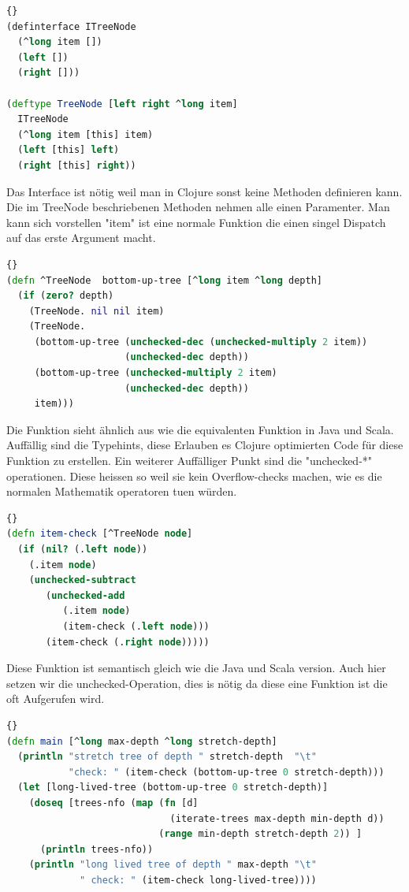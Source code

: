 \documentclass{fancydocument}
\begin{document}
\begin{lstlisting}[language=Clojure,caption=Node and Interface]{}
(definterface ITreeNode
  (^long item [])
  (left [])
  (right []))

(deftype TreeNode [left right ^long item]
  ITreeNode
  (^long item [this] item)
  (left [this] left)
  (right [this] right))
\end{lstlisting}

Das Interface ist n\"otig weil man in Clojure sonst keine Methoden
definieren kann. Die im TreeNode beschriebenen Methoden nehmen alle
einen Paramenter. Man kann sich vorstellen "item" ist eine normale
Funktion die einen singel Dispatch auf das erste Argument macht.
\\
\begin{lstlisting}[language=Clojure,caption=Cljure Tree Function]{}
(defn ^TreeNode  bottom-up-tree [^long item ^long depth]
  (if (zero? depth)
    (TreeNode. nil nil item)
    (TreeNode.
     (bottom-up-tree (unchecked-dec (unchecked-multiply 2 item))
                     (unchecked-dec depth))
     (bottom-up-tree (unchecked-multiply 2 item)
                     (unchecked-dec depth))
     item)))
\end{lstlisting}

Die Funktion sieht \"ahnlich aus wie die equivalenten Funktion in Java
und Scala. Auff\"allig sind die Typehints, diese Erlauben es Clojure
optimierten Code f\"ur diese Funktion zu erstellen. Ein weiterer
Auff\"alliger Punkt sind die "unchecked-*" operationen. Diese heissen
so weil sie kein Overflow-checks machen, wie es die normalen
Mathematik operatoren tuen w\"urden.
\\
\begin{lstlisting}[language=Clojure,caption=Cljure item-check]{}
(defn item-check [^TreeNode node]
  (if (nil? (.left node))
    (.item node)
    (unchecked-subtract
       (unchecked-add 
          (.item node)
          (item-check (.left node)))
       (item-check (.right node)))))
\end{lstlisting}

Diese Funktion ist semantisch gleich wie die Java und Scala
version. Auch hier setzen wir die unchecked-Operation, dies is n\"otig
da diese eine Funktion ist die oft Aufgerufen wird.
\\
\begin{lstlisting}[language=Clojure,caption=Clojure Main]{}
(defn main [^long max-depth ^long stretch-depth]
  (println "stretch tree of depth " stretch-depth  "\t"
           "check: " (item-check (bottom-up-tree 0 stretch-depth)))
  (let [long-lived-tree (bottom-up-tree 0 stretch-depth)]
    (doseq [trees-nfo (map (fn [d]
                             (iterate-trees max-depth min-depth d))
                           (range min-depth stretch-depth 2)) ]
      (println trees-nfo))
    (println "long lived tree of depth " max-depth "\t"
             " check: " (item-check long-lived-tree))))
\end{lstlisting}
\end{document}
